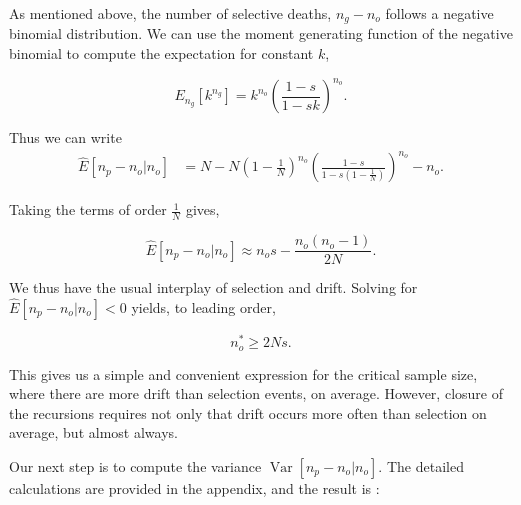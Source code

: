\documentclass[review]{elsarticle}
\newcommand{\sgcomment}[1]{{\color{red}{SG: #1}}}
\begin{document}
As mentioned above, the number of selective deaths, $n_g-n_o$ follows a negative binomial distribution.
 We can use the moment generating function of the negative binomial to compute the expectation for
constant $k$,

\begin{equation}
E_{n_g}[k^{n_g}] = k^{n_o}  \left(\frac{1-s}{1-sk}\right)^{n_o}.
\label{eq:identity}
\end{equation} 

Thus we can write 
\begin{align}
  \label{eq:lineages-exact}
  \hat{E}[n_p -n_o | n_o] &= N-N\left( 1 - \frac{1}{N} \right)^{n_o}\left( \frac{1-s}{1-s \left( 1 - \frac{1}{N} \right)}\right)^{n_o}-n_o.
\end{align}

Taking the terms of order $\frac{1}{N}$ gives,

\begin{equation*}
    \label{eq:lineages-approx}
    \hat{E}[n_p-n_o | n_o] \approx n_os - \frac{n_o (n_o-1) }{2N}. 
\end{equation*}

We thus have the usual interplay of selection and drift. Solving for $ \hat{E}[n_p -n_o | n_o]<0$
yields, to leading order,

\begin{equation}
  \label{eq:critical-sample}
  n_o^* \ge 2Ns.
\end{equation}

This gives us a simple and convenient expression for the critical sample size, where there are more drift than
selection events, on average. However, closure of the recursions requires not only that drift occurs more often than selection 
on average, but almost always. 

Our next step is to compute the variance  $\operatorname{Var}[n_p-n_o | n_o].$ The detailed calculations are provided in the 
appendix, and the result is : 
\sgcomment{Provide the equation?} 

\end{document}
